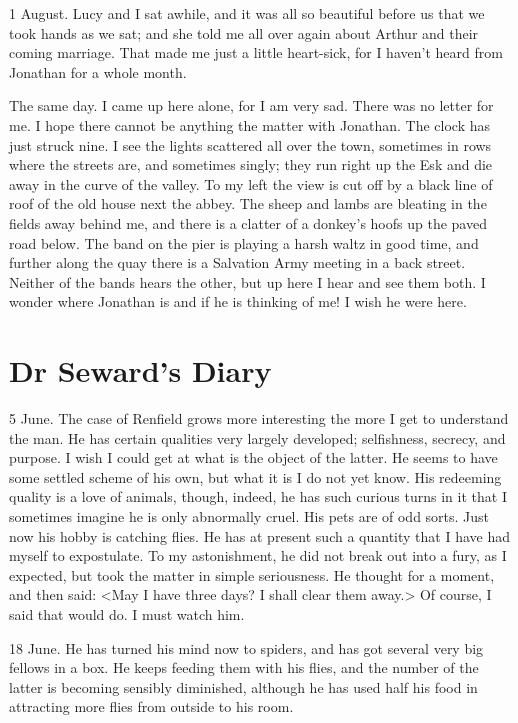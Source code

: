 \begin{diary}{1 August.}
Lucy and I sat awhile, and it was all so beautiful before us that we took hands as we sat; and she told me all over again about Arthur and their coming marriage. That made me just a little heart-sick, for I haven't heard from Jonathan for a whole month.

 

The same day. I came up here alone, for I am very sad. There was no letter for me. I hope there cannot be anything the matter with Jonathan. The clock has just struck nine. I see the lights scattered all over the town, sometimes in rows where the streets are, and sometimes singly; they run right up the Esk and die away in the curve of the valley. To my left the view is cut off by a black line of roof of the old house next the abbey. The sheep and lambs are bleating in the fields away behind me, and there is a clatter of a donkey's hoofs up the paved road below. The band on the pier is playing a harsh waltz in good time, and further along the quay there is a Salvation Army meeting in a back street. Neither of the bands hears the other, but up here I hear and see them both. I wonder where Jonathan is and if he is thinking of me! I wish he were here.
\end{diary}

\section{Dr Seward's Diary}

\begin{diary}{5 June.}
The case of Renfield grows more interesting the more I get to understand the man. He has certain qualities very largely developed; selfishness, secrecy, and purpose. I wish I could get at what is the object of the latter. He seems to have some settled scheme of his own, but what it is I do not yet know. His redeeming quality is a love of animals, though, indeed, he has such curious turns in it that I sometimes imagine he is only abnormally cruel. His pets are of odd sorts. Just now his hobby is catching flies. He has at present such a quantity that I have had myself to expostulate. To my astonishment, he did not break out into a fury, as I expected, but took the matter in simple seriousness. He thought for a moment, and then said: <May I have three days? I shall clear them away.> Of course, I said that would do. I must watch him.
\end{diary}
 
\begin{diary}{18 June.}
He has turned his mind now to spiders, and has got several very big fellows in a box. He keeps feeding them with his flies, and the number of the latter is becoming sensibly diminished, although he has used half his food in attracting more flies from outside to his room.
\end{diary}
 
